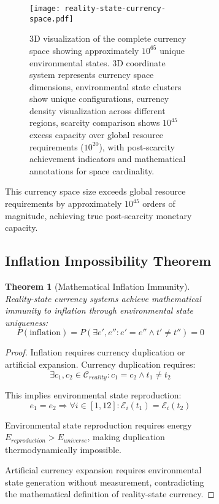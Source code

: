 \documentclass[12pt,a4paper]{article}
\newtheorem{theorem}{Theorem}
\begin{document}
\begin{figure}[H]
\begin{figure}[H]
\begin{figure}[H]
\centering
\texttt{[image: reality-state-currency-space.pdf]}
\caption{3D visualization of the complete currency space showing approximately $10^{65}$ unique environmental states. 3D coordinate system represents currency space dimensions, environmental state clusters show unique configurations, currency density visualization across different regions, scarcity comparison shows $10^{45}$ excess capacity over global resource requirements ($10^{20}$), with post-scarcity achievement indicators and mathematical annotations for space cardinality.}
\label{fig:currency_space}
\end{figure}

This currency space size exceeds global resource requirements by approximately $10^{45}$ orders of magnitude, achieving true post-scarcity monetary capacity.

\subsection{Inflation Impossibility Theorem}

\begin{theorem}[Mathematical Inflation Immunity]
Reality-state currency systems achieve mathematical immunity to inflation through environmental state uniqueness:
\begin{equation}
P(\text{inflation}) = P(\exists e', e'' : e' = e'' \land t' \neq t'') = 0
\end{equation}
\end{theorem}

\begin{proof}
Inflation requires currency duplication or artificial expansion. Currency duplication requires:
\begin{equation}
\exists c_1, c_2 \in \mathcal{C}_{reality} : c_1 = c_2 \land t_1 \neq t_2
\end{equation}

This implies environmental state reproduction:
\begin{equation}
e_1 = e_2 \Rightarrow \forall i \in [1,12] : \mathcal{E}_i(t_1) = \mathcal{E}_i(t_2)
\end{equation}

Environmental state reproduction requires energy $E_{reproduction} > E_{universe}$, making duplication thermodynamically impossible.

Artificial currency expansion requires environmental state generation without measurement, contradicting the mathematical definition of reality-state currency.


\end{proof}
\end{figure}
\end{figure}
\end{document}
